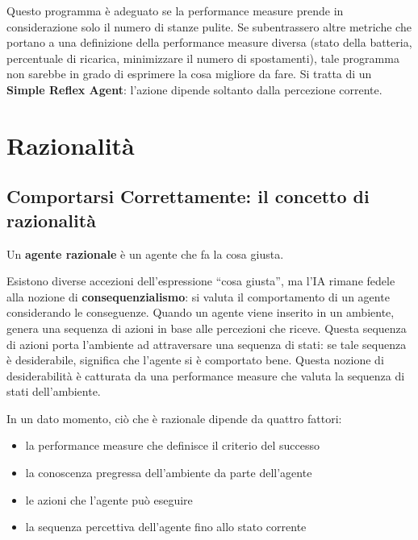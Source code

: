\documentclass[a4paper, 11pt, oneside]{book}
\theoremstyle{definition}
\begin{document}
	Questo programma \`e adeguato se la performance measure prende in considerazione
	solo il numero di stanze pulite. Se subentrassero altre metriche che portano
	a una definizione della performance measure diversa (stato della batteria,
	percentuale di ricarica, minimizzare il numero di spostamenti), tale programma
	non sarebbe in grado di esprimere la cosa migliore da fare. Si tratta di un
	\textbf{Simple Reflex Agent}: l'azione dipende soltanto dalla percezione corrente.

	\section{Razionalit\`a}
	\subsection{Comportarsi Correttamente: il concetto di razionalit\`a}

	\begin{definizione}
		Un \textbf{agente razionale} \`e un agente che fa la cosa giusta.
	\end{definizione}

	Esistono diverse accezioni dell'espressione ``cosa giusta'', ma l'IA rimane fedele
	alla nozione di \textbf{consequenzialismo}: si valuta il comportamento di un agente
	considerando le conseguenze. Quando un agente viene inserito in un ambiente, genera
	una sequenza di azioni in base alle percezioni che riceve. Questa sequenza di
	azioni porta l'ambiente ad attraversare una sequenza di stati: se tale sequenza
	\`e desiderabile, significa che l'agente si \`e comportato bene. Questa nozione
	di desiderabilit\`a \`e catturata da una performance measure che valuta la
	sequenza di stati dell'ambiente.

	In un dato momento, ci\`o che \`e razionale dipende da quattro fattori:
	\begin{itemize}
		\item la performance measure che definisce il criterio del successo

		\item la conoscenza pregressa dell'ambiente da parte dell'agente

		\item le azioni che l'agente pu\`o eseguire

		\item la sequenza percettiva dell'agente fino allo stato corrente
	\end{itemize}
\end{document}
